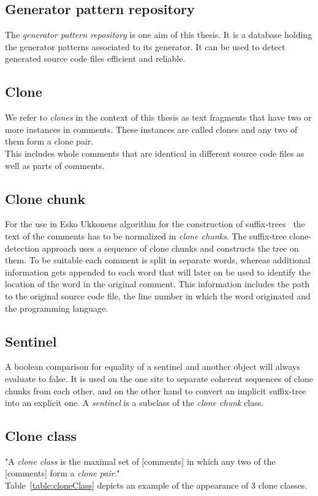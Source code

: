 \subsection{Generator pattern repository}
The \textit{generator pattern repository} is one aim of this thesis. It is a database holding the generator patterns associated to its generator. It can be used to detect generated source code files efficient and reliable.

\subsection{Clone}
We refer to \textit{clones} in the context of this thesis as text fragments that have two or more instances in comments. These instances are called clones and any two of them form a clone pair. \cite{Roy2007}\\
This includes whole comments that are identical in different source code files as well as parts of comments.

\subsection{Clone chunk}
For the use in Esko Ukkonens algorithm for the construction of suffix-trees~\cite{Ukkonen1995} the text of the comments has to be normalized in \textit{clone chunks}. The suffix-tree clone-detection approach uses a sequence of clone chunks and constructs the tree on them. To be suitable each comment is split in separate words, whereas additional information gets appended to each word that will later on be used to identify the location of the word in the original comment. This information includes the path to the original source code file, the line number in which the word originated and the programming language.

\subsection{Sentinel}
\label{section:sentinel}
A boolean comparison for equality of a sentinel and another object will always evaluate to false. It is used on the one site to separate coherent sequences of clone chunks from each other, and on the other hand to convert an implicit suffix-tree into an explicit one. A \textit{sentinel} is a subclass of the \textit{clone chunk} class. 

\subsection{Clone class}
"A \textit{clone class} is the maximal set of [comments] in which any two of the [comments] form a \textit{clone pair}."\cite[p.~3]{Bernwieser2014}\\
Table~\ref{table:cloneClass} depicts an example of the appearance of 3
clone classes.



